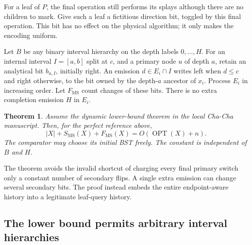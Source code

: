 \documentclass[11pt]{article}
\numberwithin{equation}{section}
\newtheorem{theorem}{Theorem}[section]
\newcommand{\OPT}{\operatorname{OPT}}
\newcommand{\MS}{\mathrm{MS}}
\begin{document}
For a leaf of $P$, the final operation still performs its splays although
there are no children to mark. Give such a leaf a fictitious direction
bit, toggled by this final operation. This bit has no effect on the
physical algorithm; it only makes the encoding uniform.

Let $B$ be any binary interval hierarchy on the depth labels
$0,\ldots,H$. For an internal interval $I=[a,b]$ split at $c$, and a
primary node $u$ of depth $a$, retain an analytical bit $b_{u,I}$,
initially right. An emission $d\in E_i\cap I$ writes left when $d\le c$
and right otherwise, to the bit owned by the depth-$a$ ancestor of
$x_i$. Process $E_i$ in increasing order. Let $F_{\MS}$ count changes of
these bits. There is no extra completion emission $H$ in $E_i$.

\begin{theorem}\label{end:thm:endpoint}
Assume the dynamic lower-bound theorem in the local Cha-Cha
manuscript. Then, for the perfect reference above,
\[
 |X|+S_{\MS}(X)+F_{\MS}(X)=O(\OPT(X)+n).
\]
The comparator may choose its initial BST freely. The constant is
independent of $B$ and $H$.
\end{theorem}

The theorem avoids the invalid shortcut of charging every final primary
switch only a constant number of secondary flips. A single extra
emission can change several secondary bits. The proof instead embeds
the entire endpoint-aware history into a legitimate leaf-query history.

\subsection{The lower bound permits arbitrary interval hierarchies}
\end{document}
